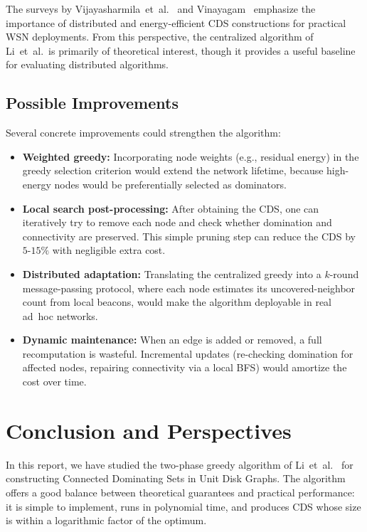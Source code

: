 \documentclass[11pt,a4paper]{article}
\begin{document}
The surveys by Vijayasharmila~et~al.~\cite{vijayasharmila2015} and
Vinayagam~\cite{vinayagam2016} emphasize the importance of distributed and
energy-efficient CDS constructions for practical WSN deployments.  From this
perspective, the centralized algorithm of Li~et~al.\ is primarily of
theoretical interest, though it provides a useful baseline for evaluating
distributed algorithms.

\subsection{Possible Improvements}

Several concrete improvements could strengthen the algorithm:

\begin{itemize}[nosep]
  \item \textbf{Weighted greedy:} Incorporating node weights (e.g., residual
        energy) in the greedy selection criterion would extend the network
        lifetime, because high-energy nodes would be preferentially selected
        as dominators.
  \item \textbf{Local search post-processing:} After obtaining the CDS, one
        can iteratively try to remove each node and check whether domination
        and connectivity are preserved.  This simple pruning step can reduce
        the CDS by~$5$-$15\%$ with negligible extra cost.
  \item \textbf{Distributed adaptation:} Translating the centralized greedy
        into a $k$-round message-passing protocol, where each node estimates
        its uncovered-neighbor count from local beacons, would make the
        algorithm deployable in real ad~hoc networks.
  \item \textbf{Dynamic maintenance:} When an edge is added or removed,
        a full recomputation is wasteful.  Incremental updates
        (re-checking domination for affected nodes, repairing connectivity
        via a local BFS) would amortize the cost over time.
\end{itemize}

\section{Conclusion and Perspectives}\label{sec:conclusion}

In this report, we have studied the two-phase greedy algorithm of
Li~et~al.~\cite{li2005} for constructing Connected Dominating Sets in Unit Disk
Graphs.  The algorithm offers a good balance between theoretical guarantees and
practical performance: it is simple to implement, runs in polynomial time, and
produces CDS whose size is within a logarithmic factor of the optimum.
\end{document}
